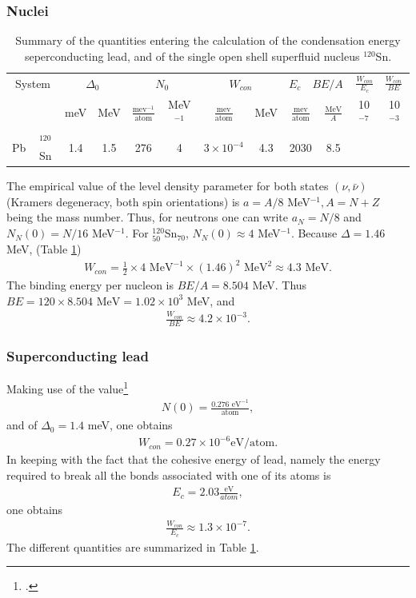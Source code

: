 \begin{subappendices}
\subsubsection{Nuclei}
\begin{table}
	\begin{tabular}{|c|c|c|c|c|c|c|c|c|c|c|c|}
		\hline
		\multicolumn{2}{|c|}{System} & \multicolumn{2}{|c|}{$\Delta_0$} &
		\multicolumn{2}{|c|}{$N_0$}&
		\multicolumn{2}{|c|}{$W_{con}$} &
		\multicolumn{2}{|c|}{$E_c\quad BE/A$} &
		\multicolumn{2}{|c|}{$\frac{W_{con}}{E_c}\quad \frac{W_{con}}{BE}$} \\
		\cline{3-12}
		\multicolumn{2}{|c|}{}& meV&MeV&$\frac{\text{mev}^{-1}}{\text{atom}}$&MeV$^{-1}$&$\frac{\text{mev}}{\text{atom}}$&MeV&$\frac{\text{mev}}{\text{atom}}$&$\frac{\text{MeV}}{A}$&10$^{-7}$&10$^{-3}$\\
		\cline{1-10}
		Pb&$^{120}$Sn& 1.4&1.5&276&4&$3\times10^{-4}$&4.3&2030&8.5&& \\
		\hline
	\end{tabular}\caption{Summary of the quantities entering the calculation of the condensation energy seperconducting lead, and of the single open shell superfluid nucleus $^{120}$Sn.}\label{Tab3.A.1}
\end{table}
The empirical value of the level density parameter for both states $(\nu,\bar \nu)$ (Kramers degeneracy, both spin orientations) is $a=A/8$ MeV$^{-1}, A=N+Z$ being the mass number. Thus, for neutrons one can write $a_N=N/8$ and $N_N(0)=N/16$ MeV$^{-1}$. For $^{120}_{50}$Sn$_{70}$, $N_N(0)\approx 4$ MeV$^{-1}$. Because $\Delta=1.46$ MeV, (Table \ref{Tab3.A.1})
\begin{align}\label{eqC3AppA3}
W_{con}=\frac{1}{2}\times 4\text{ MeV}^{-1}\times (1.46)^2\text{ MeV}^2\approx 4.3\text{ MeV}.
\end{align}
The binding energy per nucleon is $BE/A=8.504$ MeV. Thus $BE=120\times 8.504\text{ MeV}=1.02\times10^{3}$ MeV, and
\begin{align}\label{eqC3AppA4}
\frac{W_{con}}{BE}\approx 4.2\times10^{-3}.
\end{align}
\subsubsection{Superconducting lead}
Making use of the value\footnote{\cite{Beck:70}.}
\begin{align}\label{eqC3AppA5}
N(0)=\frac{0.276\text{ eV}^{-1}}{\text{atom}},
\end{align}
and of $\Delta_0=1.4$ meV, one obtains
\begin{align}\label{eqC3AppA6}
W_{con}=0.27\times10^{-6}\text{eV/atom}.
\end{align}
In keeping with the fact that the cohesive energy of lead, namely the energy required to break all the bonds associated with one of its atoms is
\begin{align}\label{eqC3AppA7}
E_c=2.03\frac{\text{eV}}{{atom}},
\end{align}
one obtains
\begin{align}\label{eqC3AppA8}
\frac{W_{con}}{E_c}\approx1.3\times10^{-7}.
\end{align}
The different quantities are summarized in Table \ref{Tab3.A.1}.

\end{subappendices}
